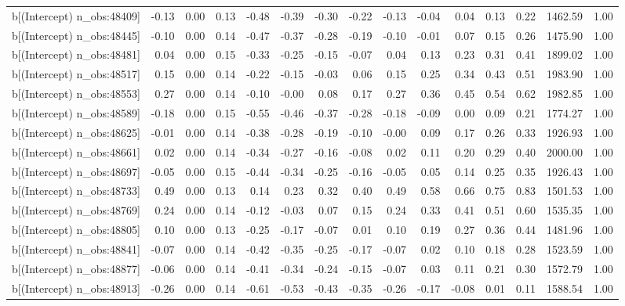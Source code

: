 \begin{table}[ht]
\begin{tabular}{rrrrrrrrrrrrrrr}
  b[(Intercept) n\_obs:48409] & -0.13 & 0.00 & 0.13 & -0.48 & -0.39 & -0.30 & -0.22 & -0.13 & -0.04 & 0.04 & 0.13 & 0.22 & 1462.59 & 1.00 \\ 
  b[(Intercept) n\_obs:48445] & -0.10 & 0.00 & 0.14 & -0.47 & -0.37 & -0.28 & -0.19 & -0.10 & -0.01 & 0.07 & 0.15 & 0.26 & 1475.90 & 1.00 \\ 
  b[(Intercept) n\_obs:48481] & 0.04 & 0.00 & 0.15 & -0.33 & -0.25 & -0.15 & -0.07 & 0.04 & 0.13 & 0.23 & 0.31 & 0.41 & 1899.02 & 1.00 \\ 
  b[(Intercept) n\_obs:48517] & 0.15 & 0.00 & 0.14 & -0.22 & -0.15 & -0.03 & 0.06 & 0.15 & 0.25 & 0.34 & 0.43 & 0.51 & 1983.90 & 1.00 \\ 
  b[(Intercept) n\_obs:48553] & 0.27 & 0.00 & 0.14 & -0.10 & -0.00 & 0.08 & 0.17 & 0.27 & 0.36 & 0.45 & 0.54 & 0.62 & 1982.85 & 1.00 \\ 
  b[(Intercept) n\_obs:48589] & -0.18 & 0.00 & 0.15 & -0.55 & -0.46 & -0.37 & -0.28 & -0.18 & -0.09 & 0.00 & 0.09 & 0.21 & 1774.27 & 1.00 \\ 
  b[(Intercept) n\_obs:48625] & -0.01 & 0.00 & 0.14 & -0.38 & -0.28 & -0.19 & -0.10 & -0.00 & 0.09 & 0.17 & 0.26 & 0.33 & 1926.93 & 1.00 \\ 
  b[(Intercept) n\_obs:48661] & 0.02 & 0.00 & 0.14 & -0.34 & -0.27 & -0.16 & -0.08 & 0.02 & 0.11 & 0.20 & 0.29 & 0.40 & 2000.00 & 1.00 \\ 
  b[(Intercept) n\_obs:48697] & -0.05 & 0.00 & 0.15 & -0.44 & -0.34 & -0.25 & -0.16 & -0.05 & 0.05 & 0.14 & 0.25 & 0.35 & 1926.43 & 1.00 \\ 
  b[(Intercept) n\_obs:48733] & 0.49 & 0.00 & 0.13 & 0.14 & 0.23 & 0.32 & 0.40 & 0.49 & 0.58 & 0.66 & 0.75 & 0.83 & 1501.53 & 1.00 \\ 
  b[(Intercept) n\_obs:48769] & 0.24 & 0.00 & 0.14 & -0.12 & -0.03 & 0.07 & 0.15 & 0.24 & 0.33 & 0.41 & 0.51 & 0.60 & 1535.35 & 1.00 \\ 
  b[(Intercept) n\_obs:48805] & 0.10 & 0.00 & 0.13 & -0.25 & -0.17 & -0.07 & 0.01 & 0.10 & 0.19 & 0.27 & 0.36 & 0.44 & 1481.96 & 1.00 \\ 
  b[(Intercept) n\_obs:48841] & -0.07 & 0.00 & 0.14 & -0.42 & -0.35 & -0.25 & -0.17 & -0.07 & 0.02 & 0.10 & 0.18 & 0.28 & 1523.59 & 1.00 \\ 
  b[(Intercept) n\_obs:48877] & -0.06 & 0.00 & 0.14 & -0.41 & -0.34 & -0.24 & -0.15 & -0.07 & 0.03 & 0.11 & 0.21 & 0.30 & 1572.79 & 1.00 \\ 
  b[(Intercept) n\_obs:48913] & -0.26 & 0.00 & 0.14 & -0.61 & -0.53 & -0.43 & -0.35 & -0.26 & -0.17 & -0.08 & 0.01 & 0.11 & 1588.54 & 1.00 \\ 

\end{tabular}
\end{table}
